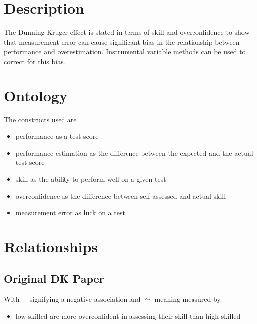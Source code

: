 \documentclass[a4paper,11pt]{article}
\newcommand{\1}{\mathbf{1}}
\begin{document}
\section{Description}
The Dunning-Kruger effect is stated in terms of skill and overconfidence to show that measurement error can cause significant bias in the relationship between performance and overestimation.
Instrumental variable methods can be used to correct for this bias.

\section{Ontology}
The constructs used are
\begin{itemize}
 \item performance as a test score
 \item performance estimation as the difference between the expected and the actual test score
 \item skill as the ability to perform well on a given test
 \item overconfidence as the difference between self-assessed and actual skill
 \item measurement error as luck on a test
\end{itemize}

\section{Relationships}

\subsection{Original DK Paper}

\begin{figure}[ht]
  \vspace{1cm}
  \begin{center}
  
  \end{center}
  \label{fig:typetree}
\end{figure}

With $-$ signifying a negative association and $\simeq$ meaning measured by.



\begin{itemize}
 \item low skilled are more overconfident in assessing their skill than high skilled
\end{itemize}
\end{document}
